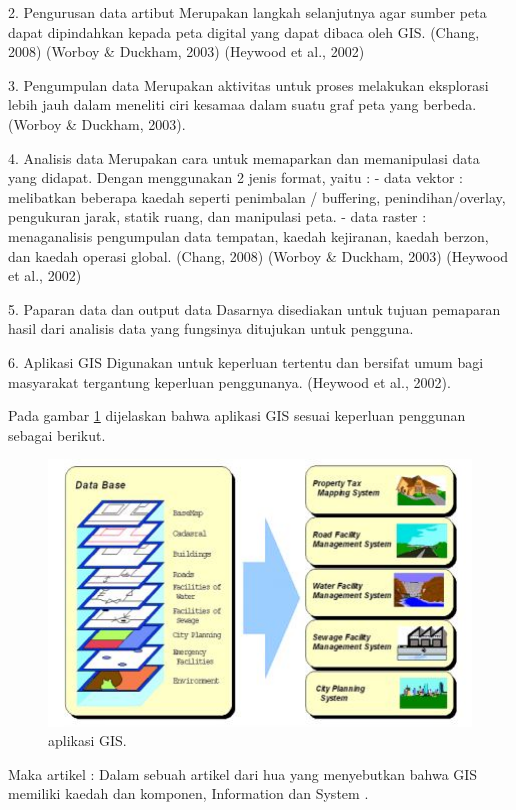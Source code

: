 2. Pengurusan data artibut
Merupakan langkah selanjutnya agar sumber peta dapat dipindahkan kepada peta digital yang dapat dibaca oleh GIS.
(Chang, 2008) (Worboy \& Duckham, 2003) (Heywood et al., 2002)

3. Pengumpulan data
Merupakan aktivitas untuk proses melakukan eksplorasi lebih jauh dalam meneliti ciri kesamaa dalam suatu graf peta yang berbeda. (Worboy \& Duckham, 2003).

4. Analisis data
Merupakan cara untuk memaparkan dan memanipulasi data yang didapat. Dengan menggunakan 2 jenis format, yaitu :
- data vektor : melibatkan beberapa kaedah seperti penimbalan / buffering, penindihan/overlay, pengukuran jarak, statik ruang, dan manipulasi peta.
- data raster : menaganalisis pengumpulan data tempatan, kaedah kejiranan, kaedah berzon, dan kaedah operasi global.
(Chang, 2008) (Worboy \& Duckham, 2003) (Heywood et al., 2002)

5. Paparan data dan output data
Dasarnya disediakan untuk tujuan pemaparan hasil dari analisis data yang fungsinya ditujukan untuk pengguna.

6. Aplikasi GIS
Digunakan untuk keperluan tertentu dan bersifat umum bagi masyarakat tergantung keperluan penggunanya. 
(Heywood et al., 2002).

Pada gambar \ref{aplikasiGIS} dijelaskan bahwa aplikasi GIS sesuai keperluan penggunan sebagai berikut.
\begin{figure}[ht]
	\centerline{\includegraphics[width=1\textwidth]{figures/aplikasiGIS.JPG}}
	\caption{aplikasi GIS.}
	\label{aplikasiGIS}
	\end{figure}
Maka artikel :
	Dalam sebuah artikel dari hua yang menyebutkan bahwa  GIS memiliki kaedah dan komponen, Information dan System \cite{hua2017sistem}.

